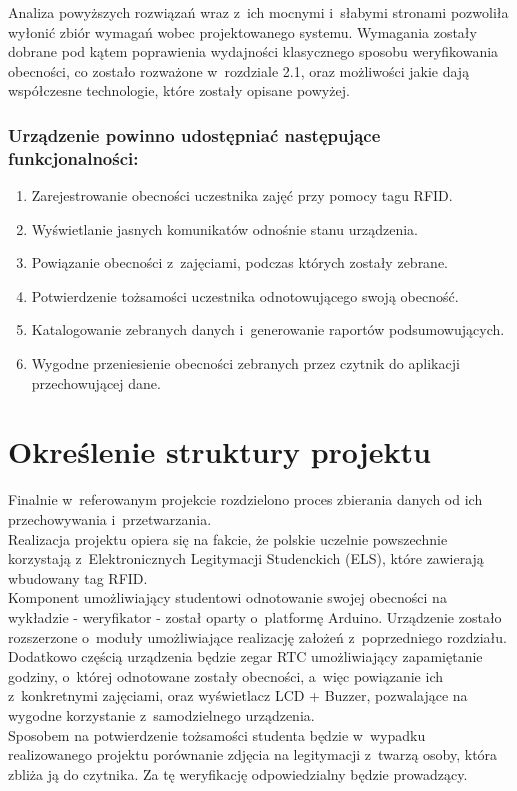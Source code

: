 \documentclass[declaration,shortabstract, mgr]{iithesis}
\begin{document}
\indent Analiza powyższych rozwiązań wraz z~ich mocnymi i~słabymi stronami pozwoliła wyłonić zbiór wymagań wobec projektowanego systemu. Wymagania zostały dobrane pod kątem poprawienia wydajności klasycznego sposobu weryfikowania obecności, co zostało rozważone w~rozdziale 2.1, oraz możliwości jakie dają współczesne technologie, które zostały opisane powyżej.

\subsubsection{Urządzenie powinno udostępniać następujące funkcjonalności:}

\begin{enumerate}
\item Zarejestrowanie obecności uczestnika zajęć przy pomocy tagu RFID.
\item Wyświetlanie jasnych komunikatów odnośnie stanu urządzenia.
\item Powiązanie obecności z~zajęciami, podczas których zostały zebrane.
\item Potwierdzenie tożsamości uczestnika odnotowującego swoją obecność.
\item Katalogowanie zebranych danych i~generowanie raportów podsumowujących.
\item Wygodne przeniesienie obecności zebranych przez czytnik do aplikacji przechowującej dane.
\end{enumerate}



\section{Określenie struktury projektu}
\indent Finalnie w~referowanym projekcie rozdzielono proces zbierania danych od ich przechowywania i~przetwarzania.\\
\indent Realizacja projektu opiera się na fakcie, że polskie uczelnie powszechnie korzystają z~Elektronicznych Legitymacji Studenckich (ELS), które zawierają wbudowany tag RFID. \\
\indent Komponent umożliwiający studentowi odnotowanie swojej obecności na wykładzie - weryfikator - został oparty o~platformę Arduino. Urządzenie zostało rozszerzone o~moduły umożliwiające realizację założeń z~poprzedniego rozdziału.\\
\indent Dodatkowo częścią urządzenia będzie zegar RTC umożliwiający zapamiętanie godziny, o~której odnotowane zostały obecności, a~więc powiązanie ich z~konkretnymi zajęciami, oraz wyświetlacz LCD + Buzzer, pozwalające na wygodne korzystanie z~samodzielnego urządzenia. \\
\indent Sposobem na potwierdzenie tożsamości studenta będzie w~wypadku realizowanego projektu porównanie zdjęcia na legitymacji z~twarzą osoby, która zbliża ją do czytnika. Za tę weryfikację odpowiedzialny będzie prowadzący.\\\\
\end{document}
